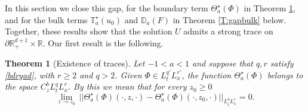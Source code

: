 \documentclass[11pt,letter]{amsart}
\def \RN {\mathbb{R}_+^{d+1}}
\def \R {\mathbb{R}}
\newcommand{\p}{\partial}
\numberwithin{equation}{section}
\newtheorem{theorem}{Theorem}[section]
\numberwithin{equation}{section}
\begin{document}
In this section we close this gap, for the boundary term $\Theta^\star_a(\Phi)$ in Theorem \ref{T:gap}, and for the bulk terms $\mathbb T^\star_a(u_0)$ and $\mathbb D_a(F)$ in Theorem \ref{T:gapbulk} below. Together, these results show that the solution $U$ admits a strong trace on $\p\RN\times\R$. Our first result is the following.

\begin{theorem}[Existence of traces]\label{T:gap}
Let $-1<a<1$ and suppose that $q, r$ satisfy \eqref{bdryad}, with $r\ge 2$ and $q>2$. Given $\Phi\in L^{q'}_t L^{r'}_x$,  
the function $\Theta^\star_a(\Phi)$ belongs to the space $C^b_z L^q_t L^r_x$. By this we mean that for every $z_0\ge 0$
\begin{equation}\label{cont}
\underset{z\to z_0}{\lim}\ ||\Theta^\star_a(\Phi)(\cdot,z,\cdot) - \Theta^\star_a(\Phi)(\cdot,z_0,\cdot)||_{L^q_t L^r_x} = 0.
\end{equation}
\end{theorem}
\end{document}
